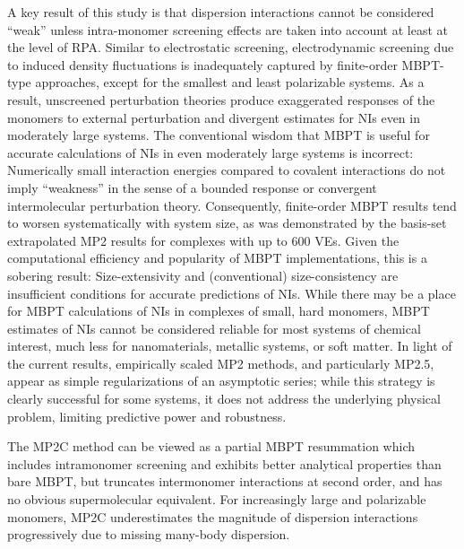 \documentclass[journal=jctcce,manuscript=article]{achemso}
\begin{document}
A key result of this study is that dispersion interactions cannot be
considered ``weak'' unless intra-monomer screening effects are taken
into account at least at the level of RPA. Similar to electrostatic
screening, electrodynamic screening due to induced density fluctuations is
inadequately captured by finite-order MBPT-type approaches, except for the
smallest and least polarizable systems. As a result, unscreened
perturbation theories 
produce exaggerated responses of the monomers to external perturbation and 
divergent estimates for NIs even in moderately large systems. The
conventional 
wisdom that MBPT is useful for accurate calculations of NIs in even
moderately large systems is incorrect: Numerically small interaction
energies compared to covalent interactions do not imply ``weakness'' in
the sense of a bounded response or convergent intermolecular perturbation
theory. Consequently, finite-order MBPT results tend to worsen systematically
with system size, as was demonstrated by the basis-set extrapolated MP2 results
for complexes with up to 600 VEs. Given the computational
efficiency and popularity of MBPT implementations, this is a sobering result:
Size-extensivity and (conventional) size-consistency are insufficient
conditions for accurate predictions of NIs. While there may
be a place for MBPT calculations of NIs in complexes of small,
hard monomers, MBPT estimates of NIs cannot be considered
reliable for most systems of chemical interest, much less for nanomaterials,
metallic systems, or soft matter. In light of the current results,
empirically scaled MP2 methods, and particularly MP2.5, appear as
simple regularizations of an asymptotic series; while this strategy is
clearly successful for some systems, it does not address the underlying
physical problem, limiting predictive power and robustness.

The MP2C
method can be viewed as a partial MBPT resummation which includes
intramonomer screening and exhibits better analytical properties than
bare MBPT, but
truncates intermonomer interactions at second order, and has no obvious
supermolecular 
equivalent. For increasingly large and polarizable monomers, MP2C
underestimates the magnitude of dispersion interactions 
progressively due to missing many-body dispersion.
\end{document}

